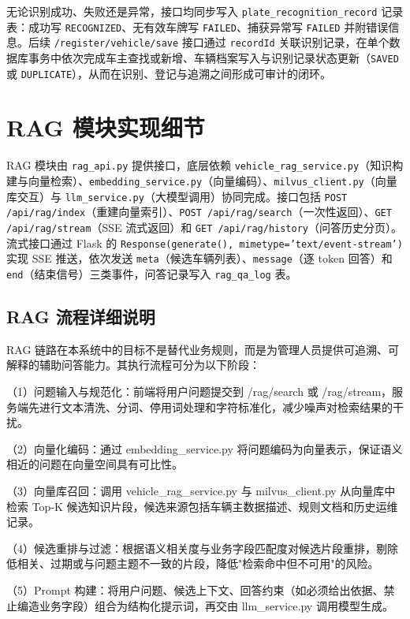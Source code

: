 \documentclass{wzuthesis} %
\begin{document}
无论识别成功、失败还是异常，接口均同步写入 \texttt{plate\_recognition\_record} 记录表：成功写 \texttt{RECOGNIZED}、无有效车牌写 \texttt{FAILED}、捕获异常写 \texttt{FAILED} 并附错误信息。后续 \texttt{/register/vehicle/save} 接口通过 \texttt{recordId} 关联识别记录，在单个数据库事务中依次完成车主查找或新增、车辆档案写入与识别记录状态更新（\texttt{SAVED} 或 \texttt{DUPLICATE}），从而在识别、登记与追溯之间形成可审计的闭环。

\section{RAG 模块实现细节}

RAG 模块由 \texttt{rag\_api.py} 提供接口，底层依赖 \texttt{vehicle\_rag\_service.py}（知识构建与向量检索）、\texttt{embedding\_service.py}（向量编码）、\texttt{milvus\_client.py}（向量库交互）与 \texttt{llm\_service.py}（大模型调用）协同完成。接口包括 \texttt{POST /api/rag/index}（重建向量索引）、\texttt{POST /api/rag/search}（一次性返回）、\texttt{GET /api/rag/stream}（SSE 流式返回）和 \texttt{GET /api/rag/history}（问答历史分页）。流式接口通过 Flask 的 \texttt{Response(generate(), mimetype='text/event-stream')} 实现 SSE 推送，依次发送 \texttt{meta}（候选车辆列表）、\texttt{message}（逐 token 回答）和 \texttt{end}（结束信号）三类事件，问答记录写入 \texttt{rag\_qa\_log} 表。


\subsection{RAG 流程详细说明}

RAG 链路在本系统中的目标不是替代业务规则，而是为管理人员提供可追溯、可解释的辅助问答能力。其执行流程可分为以下阶段：

（1）问题输入与规范化：前端将用户问题提交到 /rag/search 或 /rag/stream，服务端先进行文本清洗、分词、停用词处理和字符标准化，减少噪声对检索结果的干扰。

（2）向量化编码：通过 embedding\_service.py 将问题编码为向量表示，保证语义相近的问题在向量空间具有可比性。

（3）向量库召回：调用 vehicle\_rag\_service.py 与 milvus\_client.py 从向量库中检索 Top-K 候选知识片段，候选来源包括车辆主数据描述、规则文档和历史运维记录。

（4）候选重排与过滤：根据语义相关度与业务字段匹配度对候选片段重排，剔除低相关、过期或与问题主题不一致的片段，降低"检索命中但不可用"的风险。

（5）Prompt 构建：将用户问题、候选上下文、回答约束（如必须给出依据、禁止编造业务字段）组合为结构化提示词，再交由 llm\_service.py 调用模型生成。
\end{document}
